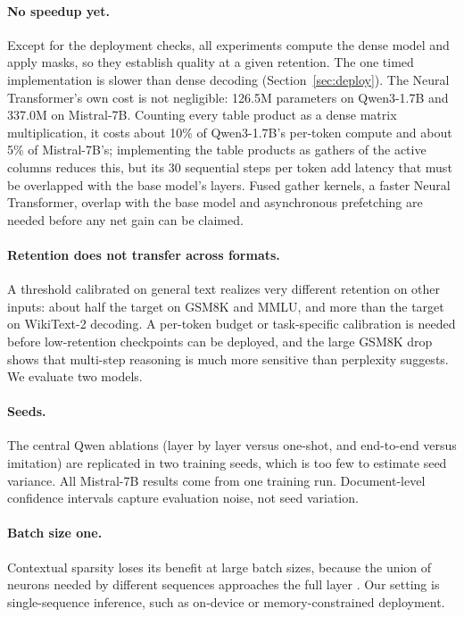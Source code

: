 \documentclass[10pt,twocolumn,letterpaper]{article}
\begin{document}
\paragraph{No speedup yet.} Except for the deployment checks, all experiments compute the dense model and apply masks, so they establish quality at a given retention. The one timed implementation is slower than dense decoding (Section~\ref{sec:deploy}). The Neural Transformer's own cost is not negligible: 126.5M parameters on Qwen3-1.7B and 337.0M on Mistral-7B. Counting every table product as a dense matrix multiplication, it costs about 10\% of Qwen3-1.7B's per-token compute and about 5\% of Mistral-7B's; implementing the table products as gathers of the active columns reduces this, but its 30 sequential steps per token add latency that must be overlapped with the base model's layers. Fused gather kernels, a faster Neural Transformer, overlap with the base model and asynchronous prefetching are needed before any net gain can be claimed.

\paragraph{Retention does not transfer across formats.} A threshold calibrated on general text realizes very different retention on other inputs: about half the target on GSM8K and MMLU, and more than the target on WikiText-2 decoding. A per-token budget or task-specific calibration is needed before low-retention checkpoints can be deployed, and the large GSM8K drop shows that multi-step reasoning is much more sensitive than perplexity suggests. We evaluate two models.

\paragraph{Seeds.} The central Qwen ablations (layer by layer versus one-shot, and end-to-end versus imitation) are replicated in two training seeds, which is too few to estimate seed variance. All Mistral-7B results come from one training run. Document-level confidence intervals capture evaluation noise, not seed variation.

\paragraph{Batch size one.} Contextual sparsity loses its benefit at large batch sizes, because the union of neurons needed by different sequences approaches the full layer \citep{shrestha2025polar}. Our setting is single-sequence inference, such as on-device or memory-constrained deployment.
\end{document}
